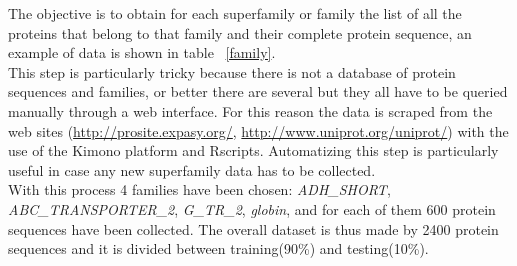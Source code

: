 \documentclass[a4paper, 10pt, conference]{ieeeconf}      %
\begin{document}
	The objective is to obtain for each superfamily or family the list of all the proteins that belong to that family and their complete protein sequence, an example of data is shown in table ~\ref{family}.\\
	This step is particularly tricky because there is not a database of protein sequences and families, or better there are several but they all have to be queried manually through a web interface. For this reason the data is scraped from the web sites (\href{http://prosite.expasy.org/}{http://prosite.expasy.org/}, \href{http://www.uniprot.org/uniprot/}{http://www.uniprot.org/uniprot/}) with the use of the Kimono platform\cite{kimono} and Rscripts. Automatizing this step is particularly useful in case any new superfamily data has to be collected.\\
	With this process 4 families have been chosen: \textit{ADH\_SHORT},\textit{ ABC\_TRANSPORTER\_2}, \textit{G\_TR\_2}, \textit{globin}, and for each of them 600 protein sequences have been collected. The overall dataset is thus made by 2400 protein sequences and it is divided between training(90\%) and testing(10\%).
	
\end{document}
